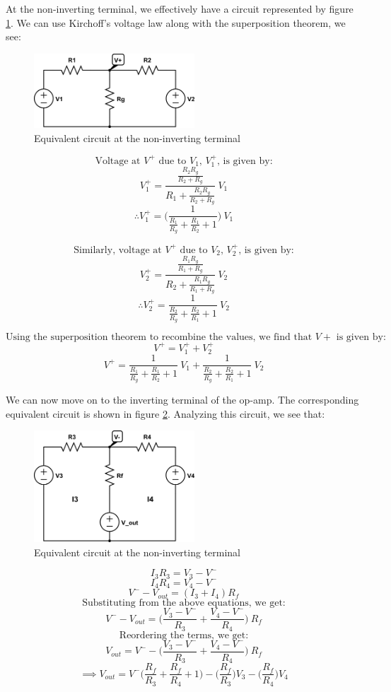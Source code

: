 \documentclass{article}
\theoremstyle{plain}
\theoremstyle{definition}
\theoremstyle{remark}
\begin{document}
At the non-inverting terminal, we effectively have a circuit represented by figure \ref{q2_b1}. We can use Kirchoff's voltage law along with the superposition theorem, we see:
\begin{figure}[h]
\begin{center}
\includegraphics[width=6cm]{lab1_q2_kvl1.png}
\end{center}
\caption{Equivalent circuit at the non-inverting terminal}
\label{q2_b1}
\end{figure}

$$\text{Voltage at $V^+$ due to $V_1$, $V^+_1$, is given by:}$$
$$V^+_1 = \frac{\frac{R_2 R_g}{R_2+R_g}}{R_1 + \frac{R_2 R_g}{R_2+R_g}}\ V_1$$
$$\therefore V^+_1 = \Big(\frac{1}{\frac{R_1}{R_g} + \frac{R_1}{R_2} + 1}\Big) \ V_1$$

$$\text{Similarly, voltage at $V^+$ due to $V_2$, $V^+_2$, is given by:}$$
$$V^+_2 = \frac{\frac{R_1 R_g}{R_1+R_g}}{R_2 + \frac{R_1 R_g}{R_1+R_g}}\ V_2$$
$$\therefore  V^+_2 = \frac{1}{\frac{R_2}{R_g} + \frac{R_2}{R_1} + 1} \ V_2$$

$$\text{Using the superposition theorem to recombine the values, we find that $V+$ is given by:}$$
$$V^+ = V^+_1 + V^+_2 $$
$$V^+ = \frac{1}{\frac{R_1}{R_g} + \frac{R_1}{R_2} + 1} \ V_1 + \frac{1}{\frac{R_2}{R_g} + \frac{R_2}{R_1} + 1} \ V_2 $$

We can now move on to the inverting terminal of the op-amp. The corresponding equivalent circuit is shown in figure \ref{q2_b2}.  Analyzing this circuit, we see that:
\begin{figure}[h]
\begin{center}
\includegraphics[width=6cm]{lab1_q2_kvl2.png}
\end{center}
\caption{Equivalent circuit at the non-inverting terminal}
\label{q2_b2}
\end{figure}
$$I_3R_3 = V_3 - V^-$$
$$I_4R_4 = V_4 - V^-$$
$$V^- - V_{out} = (I_3 + I_4)R_f $$
$$\text{Substituting from the above equations, we get:}$$
$$ V^- - V_{out} = \Big( \frac{ V_3 - V^-}{R_3} + \frac{ V_4 - V^-}{R_4}\Big) \ R_f$$
$$\text{Reordering the terms, we get:}$$
$$V_{out} =V^- -  \Big( \frac{ V_3 - V^-}{R_3} + \frac{ V_4 - V^-}{R_4}\Big) \ R_f $$
$$\implies V_{out} =V^- \Big( \frac{R_f}{R_3} + \frac{ R_f}{R_4} + 1\Big) - \Big( \frac{R_f}{R_3}\Big)V_3 - \Big( \frac{ R_f}{R_4}\Big)V_4$$
\end{document}
